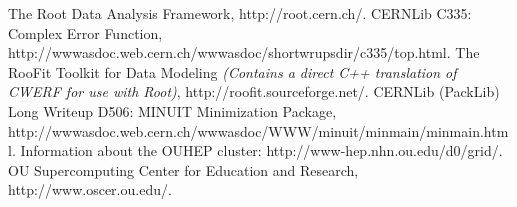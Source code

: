\documentclass{article}
\begin{document}
\begin{thebibliography}{0}

 The Root Data Analysis Framework, http://root.cern.ch/.
 CERNLib C335: Complex Error Function, http://wwwasdoc.web.cern.ch/wwwasdoc/shortwrupsdir/c335/top.html.
 The RooFit Toolkit for Data Modeling {\em (Contains a direct C++ translation of CWERF for use with Root)}, http://roofit.sourceforge.net/.
 CERNLib (PackLib) Long Writeup D506: MINUIT Minimization Package, http://wwwasdoc.web.cern.ch/wwwasdoc/WWW/minuit/minmain/minmain.html.
 Information about the OUHEP cluster: http://www-hep.nhn.ou.edu/d0/grid/.
 OU Supercomputing Center for Education and Research, http://www.oscer.ou.edu/.
\end{thebibliography}

%
\end{document}

